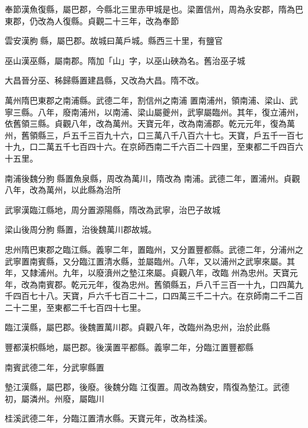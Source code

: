 \begin{pinyinscope}
 奉節漢魚復縣，屬巴郡，今縣北三里赤甲城是也。梁置信州，周為永安郡，隋為巴東郡，仍改為人復縣。貞觀二十三年，改為奉節



 雲安漢朐縣，屬巴郡。故城曰萬戶城。縣西三十里，有鹽官



 巫山漢巫縣，屬南郡。隋加「山」字，以巫山硤為名。舊治巫子城



 大昌晉分巫、秭歸縣置建昌縣，又改為大昌。隋不改。



 萬州隋巴東郡之南浦縣。武德二年，割信州之南浦
 置南浦州，領南浦、梁山、武寧三縣。八年，廢南浦州，以南浦、梁山屬夔州，武寧屬臨州。其年，復立浦州，依舊領三縣。貞觀八年，改為萬州。天寶元年，改為南浦郡。乾元元年，復為萬州，舊領縣三，戶五千三百九十六，口三萬八千八百六十七。天寶，戶五千一百七十九，口二萬五千七百四十六。在京師西南二千六百二十四里，至東都二千四百六十五里。



 南浦後魏分朐縣置魚泉縣，周改為萬川，隋改為
 南浦。武德二年，置浦州。貞觀八年，改為萬州，以此縣為治所



 武寧漢臨江縣地，周分置源陽縣，隋改為武寧，治巴子故城



 梁山後周分朐縣置，治後魏萬川郡故城。



 忠州隋巴東郡之臨江縣。義寧二年，置臨州，又分置豐都縣。武德二年，分浦州之武寧置南賓縣，又分臨江置清水縣，並屬臨州。八年，又以浦州之武寧來屬。其年，又隸浦州。九年，以廢濆州之墊江來屬。貞觀八年，改臨
 州為忠州。天寶元年，改為南賓郡。乾元元年，復為忠州。舊領縣五，戶八千三百一十九，口四萬九千四百七十八。天寶，戶六千七百二十二，口四萬三千二十六。在京師南二千二百二十二里，至東都二千七百四十七里。



 臨江漢縣，屬巴郡。後魏置萬川郡。貞觀八年，改臨州為忠州，治於此縣



 豐都漢枳縣地，屬巴郡。後漢置平都縣。義寧二年，分臨江置豐都縣



 南賓武德二年，分武寧縣置



 墊江漢縣，屬巴郡，後廢。後魏分臨
 江復置。周改為魏安，隋復為墊江。武德初，屬潾州。州廢，屬臨川



 桂溪武德二年，分臨江置清水縣。天寶元年，改為桂溪。



\end{pinyinscope}